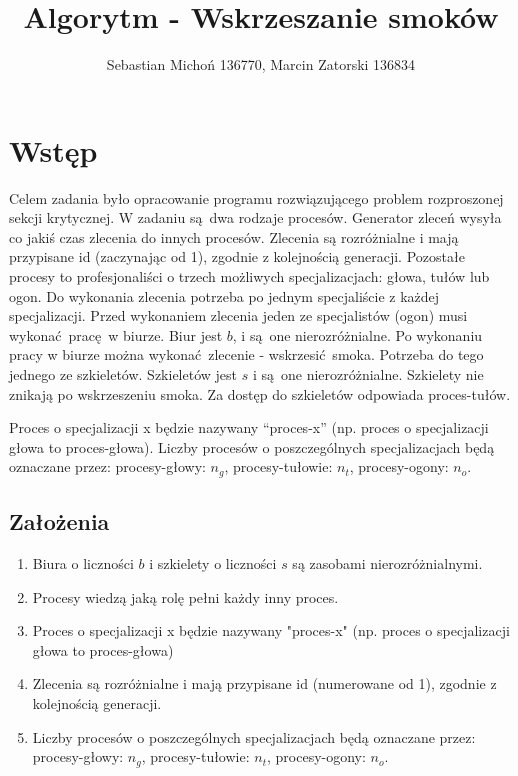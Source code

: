 \documentclass[12pt]{article}
\begin{document}
\title{Algorytm - Wskrzeszanie smoków}
\author{Sebastian Michoń 136770, Marcin Zatorski 136834}
\date{}
\maketitle

\section{Wstęp}
Celem zadania było opracowanie programu rozwiązującego problem rozproszonej sekcji krytycznej. W zadaniu są dwa rodzaje procesów. Generator zleceń wysyła co jakiś czas zlecenia do innych procesów. Zlecenia są rozróżnialne i mają przypisane id (zaczynając od 1), zgodnie z kolejnością generacji. Pozostałe procesy to profesjonaliści o trzech możliwych specjalizacjach: głowa, tułów lub ogon. Do wykonania zlecenia potrzeba po jednym specjaliście z każdej specjalizacji. Przed wykonaniem zlecenia jeden ze specjalistów (ogon) musi wykonać pracę w biurze. Biur jest $b$, i są one nierozróżnialne. Po wykonaniu pracy w biurze można wykonać zlecenie - wskrzesić smoka. Potrzeba do tego jednego ze szkieletów. Szkieletów jest $s$ i są one nierozróżnialne. Szkielety nie znikają po wskrzeszeniu smoka. Za dostęp do szkieletów odpowiada proces-tułów.

Proces o specjalizacji x będzie nazywany ``proces-x'' (np. proces o specjalizacji głowa to proces-głowa). Liczby procesów o poszczególnych specjalizacjach będą oznaczane przez: procesy-głowy: $n_g$, procesy-tułowie: $n_t$, procesy-ogony: $n_o$.

\subsection{Założenia}
	\begin{enumerate}
		\item Biura o liczności $b$ i szkielety o liczności $s$ są zasobami nierozróżnialnymi.
		\item Procesy wiedzą jaką rolę pełni każdy inny proces.
		\item Proces o specjalizacji x będzie nazywany "proces-x" (np. proces o specjalizacji głowa to proces-głowa)
		\item Zlecenia są rozróżnialne i mają przypisane id (numerowane od 1), zgodnie z kolejnością generacji.
		\item Liczby procesów o poszczególnych specjalizacjach będą oznaczane przez: procesy-głowy: $n_g$, procesy-tułowie: $n_t$, procesy-ogony: $n_o$.
	\end{enumerate}
\end{document}
